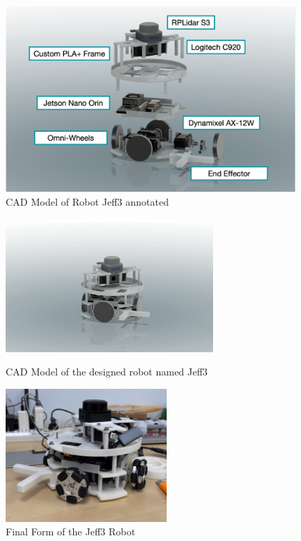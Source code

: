 \begin{figure}
    \centering
    \includegraphics[height=7cm]{assets/images/hardware/robot-exploded-annotated.png}
    \caption{CAD Model of Robot Jeff3 annotated}
    \label{fig:robot-exploded}
\end{figure}


\begin{figure}[!htb]
    \begin{minipage}{0.41\textwidth}
        \includegraphics[height=5cm]{assets/images/hardware/robot-model.png}
        \caption{CAD Model of the designed robot named Jeff3}
        \label{fig:robot-cad}
    \end{minipage}
    \hspace{0.1\textwidth} %
    \begin{minipage}{0.41\textwidth}
    \includegraphics[height=5cm]{assets/images/hardware/irl-robot.png}
    \caption{Final Form of the Jeff3 Robot}
    \label{fig:irl-robot}
    \end{minipage}
\end{figure}
